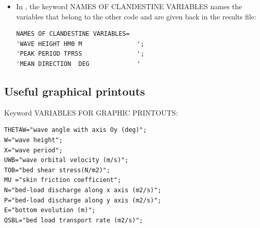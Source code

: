 \begin{itemize}
\item In , the keyword {\ttfamily NAMES OF CLANDESTINE VARIABLES} names the variables that belong to the other code and are given back in the results file:
\begin{lstlisting}[frame=trBL]
NAMES OF CLANDESTINE VARIABLES=
'WAVE HEIGHT HM0 M               ';
'PEAK PERIOD TPR5S               ';
'MEAN DIRECTION  DEG             '
\end{lstlisting}
\end{itemize}

\subsection{Useful graphical printouts}
Keyword {\ttfamily VARIABLES FOR GRAPHIC PRINTOUTS}:
\begin{lstlisting}[frame=trBL]
THETAW="wave angle with axis Oy (deg)";
W="wave height";
X="wave period";
UWB="wave orbital velocity (m/s)";
TOB="bed shear stress(N/m2)";
MU ="skin friction coefficient";
N="bed-load discharge along x axis (m2/s)";
P="bed-load discharge along y axis (m2/s)";
E="bottom evolution (m)";
QSBL="bed load transport rate (m2/s)";
\end{lstlisting}
